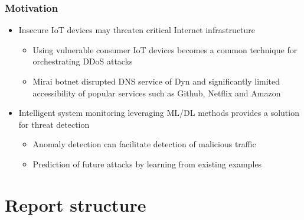 \documentclass[10pt, presentation]{beamer}
\begin{document}
\begin{frame}
\frametitle{Motivation}
  \begin{itemize}
    \item Insecure IoT devices may threaten critical Internet infrastructure
      \begin{itemize}
          \item Using vulnerable consumer IoT devices becomes a common technique for orchestrating DDoS attacks
          \item Mirai botnet disrupted DNS service of Dyn and significantly limited accessibility of popular services such as Github, Netflix and Amazon
      \end{itemize}
      \item Intelligent system monitoring  leveraging ML/DL methods provides a solution for threat detection
      \begin{itemize}
          \item Anomaly detection can facilitate detection of malicious traffic
          \item Prediction of future attacks by learning from existing examples
        \end{itemize}
  \end{itemize}
\end{frame}

\section{Report structure}
\end{document}
